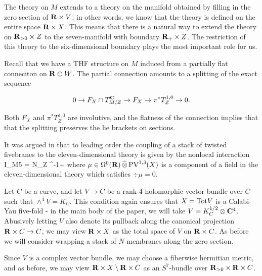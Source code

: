 The theory on $M$ extends to a theory on the manifold obtained by filling in the zero section of $\mathbf{R} \times V$; in other words, we know that the theory is defined on the entire space $\mathbf{R} \times X$.
This means that there is a natural way to extend the theory on $\mathbf{R}_{>0} \times Z$ to the seven-manifold with boundary $\mathbf{R}_{+} \times Z$.
The restriction of this theory to the six-dimensional boundary plays the most important role for us.

Recall that we have a THF structure on $M$ induced from a partially flat conneciton on $\mathbf{R}\oplus W$. The partial connection amounts to a splitting of the exact sequence

\[
  0 \to F_{X}\cap T_{M/Z}^{\mathbf{C}}\to F_{X}\to \pi^{*}T^{1,0}_{Z}\to 0
.\]

Both $F_{X}$ and $\pi^{*}T^{1,0}_{Z}$ are involutive, and the flatness of the connection implies that that the splitting preserves the lie brackets on sections.

It was argued in \cite{RSW} that to leading order the coupling of a stack of twisted fivebranes to the eleven-dimensional theory is given by the nonlocal interaction
\beqn\label{eqn:br1}
I_{M5} = N\int_{Z} \div^{-1}\mu \vee \Omega +\cdots
\eeqn
where $\mu \in \Omega^0 (\mathbf{R}) \, \widehat{\otimes} \, {\rm PV}^{1,3}(X)$ is a component of a field in the eleven-dimensional theory which satisfies $\div \mu = 0$.

\parsec
Let $C$ be a curve, and let $V\to C$ be a rank 4-holomorphic vector bundle over $C$ such that $\wedge^{4} V = K_{C}$. This condition again ensures that $X = {\rm Tot} V$ is a Calabi-Yau five-fold - in the main body of the paper, we will take $V = K^{1/2}_{C}\otimes \mathbf{C}^{4}$. Abusively letting $V$ also denote its pullback along the canonical projection $\mathbf{R}\times C \to C$, we may view $\mathbf{R}\times X$ as the total space of $V$ on $\mathbf{R}\times C$. As before we will consider wrapping a stack of $N$ membranes along the zero section.

Since $V$ is a complex vector bundle, we may choose a fiberwise hermitian metric, and as before, we may view $\mathbf{R}\times X \setminus \mathbf{R}\times C$ as an $S^{7}$-bundle over $\mathbf{R}_{>0}\times \mathbf{R}\times C$.



